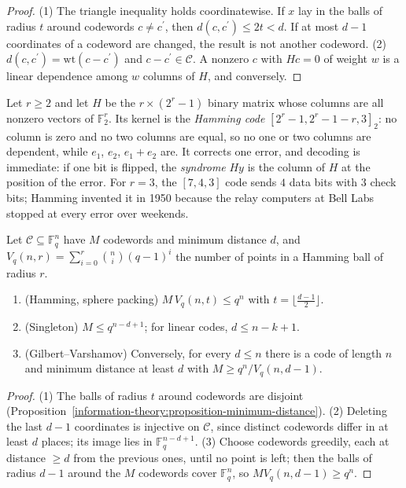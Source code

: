\begin{proof}
(1) The triangle inequality holds coordinatewise. If $x$ lay in the balls of radius $t$ around codewords $c \neq c^{\prime}$, then $d(c, c^{\prime}) \leq 2t < d$. If at most $d - 1$ coordinates of a codeword are changed, the result is not
another codeword. (2) $d(c, c^{\prime}) = \mathrm{wt}(c - c^{\prime})$ and $c - c^{\prime} \in \mathcal{C}$. A nonzero $c$ with $Hc = 0$ of weight $w$ is a linear dependence among $w$ columns of $H$, and conversely.
\end{proof}

\begin{example}\label{information-theory:example-hamming-codes}
Let $r \geq 2$ and let $H$ be the $r \times (2^r - 1)$ binary matrix whose columns are all nonzero vectors of $\mathbb{F}_2^r$. Its kernel is the \emph{Hamming code} $[2^r - 1, 2^r - 1 - r, 3]_2$: no column is zero and no two
columns are equal, so no one or two columns are dependent, while $e_1$, $e_2$, $e_1 + e_2$ are. It corrects one error, and decoding is immediate: if one bit is flipped, the \emph{syndrome} $Hy$ is the column of $H$ at the
position of the error. For $r = 3$, the $[7, 4, 3]$ code sends $4$ data bits with $3$ check bits; Hamming invented it in 1950 because the relay computers at Bell Labs stopped at every error over weekends.
\end{example}

\begin{theorem}\label{information-theory:theorem-code-bounds}
Let $\mathcal{C} \subseteq \mathbb{F}_q^n$ have $M$ codewords and minimum distance $d$, and $V_q(n, r) = \sum_{i=0}^r\binom ni(q - 1)^i$ the number of points in a Hamming ball of radius $r$.
\begin{enumerate}
\item (Hamming, sphere packing) $M\,V_q(n, t) \leq q^n$ with $t = \lfloor\frac{d - 1}{2}\rfloor$.
\item (Singleton) $M \leq q^{n - d + 1}$; for linear codes, $d \leq n - k + 1$.
\item (Gilbert--Varshamov) Conversely, for every $d \leq n$ there is a code of length $n$ and minimum distance at least $d$ with $M \geq q^n/V_q(n, d - 1)$.
\end{enumerate}
\end{theorem}

\begin{proof}
(1) The balls of radius $t$ around codewords are disjoint (Proposition~\ref{information-theory:proposition-minimum-distance}). (2) Deleting the last $d - 1$ coordinates is injective on $\mathcal{C}$, since distinct codewords differ in at
least $d$ places; its image lies in $\mathbb{F}_q^{n - d + 1}$. (3) Choose codewords greedily, each at distance $\geq d$ from the previous ones, until no point is left; then the balls of radius $d - 1$ around the $M$ codewords cover
$\mathbb{F}_q^n$, so $MV_q(n, d - 1) \geq q^n$.
\end{proof}

